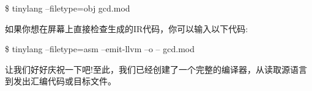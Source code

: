 \begin{tcolorbox}[colback=white,colframe=black]
\$ tinylang –filetype=obj gcd.mod
\end{tcolorbox}

如果你想在屏幕上直接检查生成的IR代码，你可以输入以下代码:\par

\begin{tcolorbox}[colback=white,colframe=black]
\$ tinylang –filetype=asm –emit-llvm –o – gcd.mod
\end{tcolorbox}

让我们好好庆祝一下吧!至此，我们已经创建了一个完整的编译器，从读取源语言到发出汇编代码或目标文件。\par




